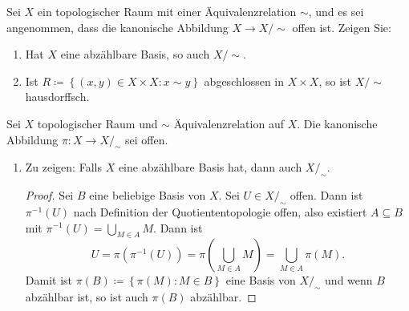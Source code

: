 \begin{assignment}
  Sei \( X \) ein topologischer Raum mit einer Äquivalenzrelation \( \sim \), und es sei angenommen, dass die kanonische Abbildung \( X \to X/\sim \) offen ist. Zeigen Sie:
  \begin{enumerate}[label= (\alph*)]
    \item Hat \( X \) eine abzählbare Basis, so auch \( X/\sim \).
    \item Ist \( R \coloneqq \left \{ (x,y) \in X \times X : x \sim y \right \} \) abgeschlossen in \( X \times X \), so ist \( X/\sim \) hausdorffsch.
  \end{enumerate}
\end{assignment}
\begin{solution}
  Sei \( X \) topologischer Raum und \( \sim \) Äquivalenzrelation auf \( X \). Die kanonische Abbildung \( \pi : X \to X/_\sim \) sei offen.
  \begin{enumerate}[label= (\alph*)]
    \item Zu zeigen: Falls \( X \) eine abzählbare Basis hat, dann auch \( X/_\sim \).
    \begin{proof}
      Sei \( B \) eine beliebige Basis von \( X \). Sei \( U \in X/_\sim \) offen. Dann ist \( \pi^{-1}(U) \) nach Definition der Quotiententopologie offen, also existiert \( A \subseteq B \) mit \( \pi^{-1}(U) = \bigcup_{M \in A}M \). Dann ist
      \begin{equation*}
        U = \pi(\pi^{-1}(U)) = \pi\left(\bigcup_{M \in A} M \right) = \bigcup_{M \in A} \pi(M)\text{.}
      \end{equation*}
      Damit ist \( \pi(B) \coloneqq \left \{ \pi(M): M \in B \right \} \) eine Basis von \( X/_\sim \) und wenn \( B \) abzählbar ist, so ist auch \( \pi(B) \) abzählbar.
    \end{proof}
    

\end{enumerate}
\end{solution}
